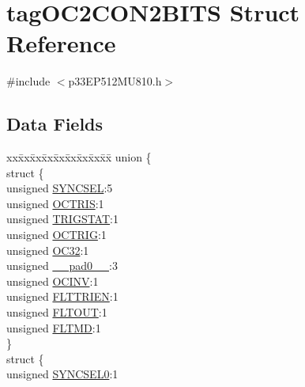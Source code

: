 \hypertarget{structtag_o_c2_c_o_n2_b_i_t_s}{}\section{tag\+O\+C2\+C\+O\+N2\+B\+I\+TS Struct Reference}
\label{structtag_o_c2_c_o_n2_b_i_t_s}


{\ttfamily \#include $<$p33\+E\+P512\+M\+U810.\+h$>$}

\subsection*{Data Fields}
\begin{DoxyCompactItemize}
\item 
\begin{tabbing}
xx\=xx\=xx\=xx\=xx\=xx\=xx\=xx\=xx\=\kill
union \{\\
\>struct \{\\
\>\>unsigned \hyperlink{structtag_o_c2_c_o_n2_b_i_t_s_a35fbbe11485c2615ed27535b62c3fa35}{SYNCSEL}:5\\
\>\>unsigned \hyperlink{structtag_o_c2_c_o_n2_b_i_t_s_ab849a74c6179282ed6b06cc047c80544}{OCTRIS}:1\\
\>\>unsigned \hyperlink{structtag_o_c2_c_o_n2_b_i_t_s_ab379549de54ac93ad4aa73686c34cb7c}{TRIGSTAT}:1\\
\>\>unsigned \hyperlink{structtag_o_c2_c_o_n2_b_i_t_s_a8d2cf9b996ef2b9079defa8950de798c}{OCTRIG}:1\\
\>\>unsigned \hyperlink{structtag_o_c2_c_o_n2_b_i_t_s_af52e127483a703e0fa84c7d4f1de0df4}{OC32}:1\\
\>\>unsigned \hyperlink{structtag_o_c2_c_o_n2_b_i_t_s_adf71f3d8410c1f1dbbc96680a92c49af}{\_\_pad0\_\_}:3\\
\>\>unsigned \hyperlink{structtag_o_c2_c_o_n2_b_i_t_s_a301004fca40c8d19d418866c92c19a06}{OCINV}:1\\
\>\>unsigned \hyperlink{structtag_o_c2_c_o_n2_b_i_t_s_ab979b75e02643aa840fb6ee50e0c30fa}{FLTTRIEN}:1\\
\>\>unsigned \hyperlink{structtag_o_c2_c_o_n2_b_i_t_s_ae466664b094d9c830e9ce20b86d7907f}{FLTOUT}:1\\
\>\>unsigned \hyperlink{structtag_o_c2_c_o_n2_b_i_t_s_a245ca3019d6c6ccbfb09f1c821146bb5}{FLTMD}:1\\
\>\} \\
\>struct \{\\
\>\>unsigned \hyperlink{structtag_o_c2_c_o_n2_b_i_t_s_a3b5df3154fde5141e6ac0156425ff8b4}{SYNCSEL0}:1\\

\end{tabbing}
\end{DoxyCompactItemize}
